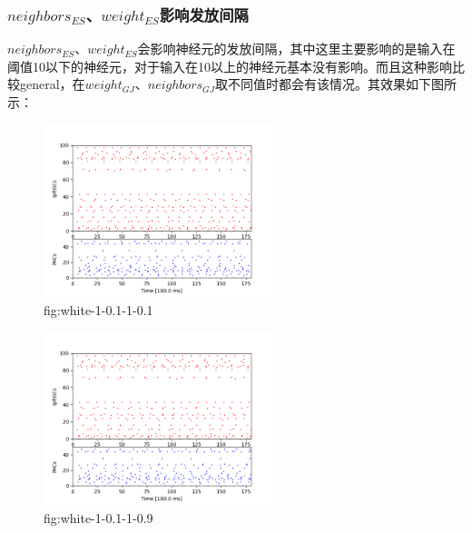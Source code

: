 \documentclass[lang=cn,11pt,a4paper,cite=numbers]{elegantpaper}
\begin{document}
\subsubsection{$neighbors_{ES}$、$weight_{ES}$影响发放间隔}
  $neighbors_{ES}$、$weight_{ES}$会影响神经元的发放间隔，其中这里主要影响的是输入在阈值10以下的神经元，对于输入在10以上的神经元基本没有影响。而且这种影响比较general，在$weight_{GJ}$、$neighbors_{GJ}$取不同值时都会有该情况。其效果如下图所示：
\begin{figure}[!htb]
  \centering
  \includegraphics[width=0.6\textwidth]{figs/white-1-0.1-1-0.1.png}
  \caption{fig:white-1-0.1-1-0.1}
  \label{fig:white-1-0.1-1-0.1}
\end{figure}
\begin{figure}[!htb]
  \centering
  \includegraphics[width=0.6\textwidth]{figs/white-1-0.1-1-0.9.png}
  \caption{fig:white-1-0.1-1-0.9}
  \label{fig:white-1-0.1-1-0.9}
\end{figure}
\end{document}
